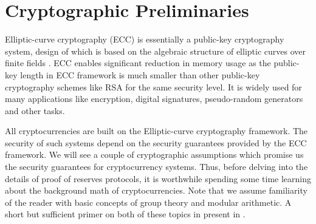 
\chapter{Cryptographic Preliminaries}
\label{chap:crypto_prelims}

Elliptic-curve cryptography (ECC) is essentially a public-key cryptography system, design of which is based on the algebraic structure of elliptic curves over finite fields \cite{Koblitz2011}.
ECC enables significant reduction in memory usage as the public-key length in ECC framework is much smaller than other public-key cryptography schemes like RSA for the same security level.
It is widely used for many applications like encryption, digital signatures, pseudo-random generators and other tasks. 

All cryptocurrencies are built on the Elliptic-curve cryptography framework.
The security of such systems depend on the security guarantees provided by the ECC framework.
We will see a couple of cryptographic assumptions which promise us the security guarantees for cryptocurrency systems.
Thus, before delving into the details of proof of reserves protocols, it is worthwhile spending some time learning about the background math of cryptocurrencies.
Note that we assume familiarity of the reader with basic concepts of group theory and modular arithmetic.
A short but sufficient primer on both of these topics in present in \cite{Sarva2017}. 


